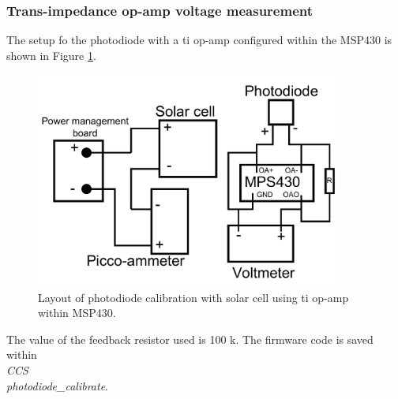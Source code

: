 \documentclass[11pt]{article} %
\begin{document}
\subsubsection{Trans-impedance op-amp voltage measurement}
The setup fo the photodiode with a ti op-amp configured within the MSP430 is shown in Figure \ref{fig:photodiode_solar_cell_calibration_op-amp}.
\begin{figure}[htbp]
	\center
	\includegraphics[width = 0.9\textwidth]{../images/photodiode_solar_cell_calibration_op-amp.pdf}
	\caption{Layout of photodiode calibration with solar cell using ti op-amp within MSP430.}
	\label{fig:photodiode_solar_cell_calibration_op-amp}
\end{figure}
The value of the feedback resistor used is 100 k.  The firmware code is saved within \emph{\\CCS\\photodiode\_calibrate}.
\end{document}
